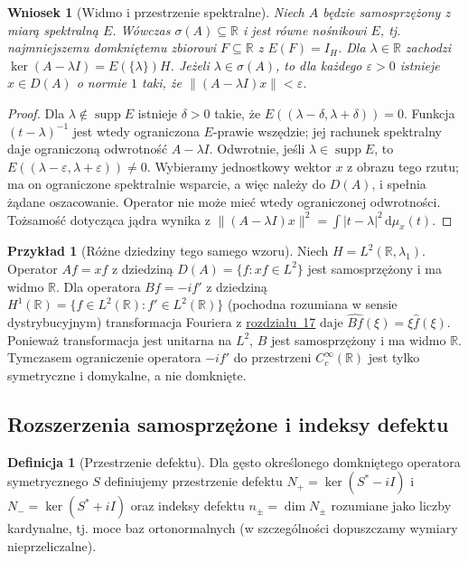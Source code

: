 \documentclass[11pt,a4paper]{article}
\numberwithin{equation}{section}
\theoremstyle{plain}
\newtheorem{wniosek}[twierdzenie]{Wniosek}
\theoremstyle{definition}
\newtheorem{definicja}[twierdzenie]{Definicja}
\newtheorem{przyklad}[twierdzenie]{Przykład}
\theoremstyle{remark}
\newcommand{\R}{\mathbb R}
\begin{document}
\begin{wniosek}[Widmo i przestrzenie spektralne]
\label{cor:unbounded-spectrum33}
Niech $A$ będzie samosprzężony z miarą spektralną $E$.
Wówczas $\sigma(A)\subseteq\R$ i jest równe nośnikowi $E$,
tj. najmniejszemu domkniętemu zbiorowi $F\subseteq\R$
z $E(F)=I_H$. Dla $\lambda\in\R$ zachodzi
$\ker(A-\lambda I)=E(\{\lambda\})H$.
Jeżeli $\lambda\in\sigma(A)$, to dla każdego $\varepsilon>0$
istnieje $x\in D(A)$ o normie $1$ taki, że
$\|(A-\lambda I)x\|<\varepsilon$.
\end{wniosek}
\begin{proof}
Dla $\lambda\notin\operatorname{supp}E$ istnieje $\delta>0$
takie, że $E((\lambda-\delta,\lambda+\delta))=0$.
Funkcja $(t-\lambda)^{-1}$ jest wtedy ograniczona
$E$-prawie wszędzie; jej rachunek spektralny daje ograniczoną
odwrotność $A-\lambda I$. Odwrotnie, jeśli
$\lambda\in\operatorname{supp}E$, to
$E((\lambda-\varepsilon,\lambda+\varepsilon))\ne0$.
Wybieramy jednostkowy wektor $x$ z obrazu tego rzutu;
ma on ograniczone spektralnie wsparcie, a więc należy do $D(A)$,
i spełnia żądane oszacowanie. Operator nie może mieć wtedy
ograniczonej odwrotności. Tożsamość dotycząca jądra wynika
z $\|(A-\lambda I)x\|^2=\int|t-\lambda|^2\,\mathrm d\mu_x(t)$.
\end{proof}

\begin{przyklad}[Różne dziedziny tego samego wzoru]
Niech $H=L^2(\R,\lambda_1)$.
Operator $Af=xf$ z dziedziną $D(A)=\{f:xf\in L^2\}$ jest
samosprzężony i ma widmo $\R$. Dla operatora
$Bf=-if'$ z dziedziną $H^1(\R)=\{f\in L^2(\R):f'\in L^2(\R)\}$
(pochodna rozumiana w sensie dystrybucyjnym) transformacja Fouriera
z \hyperref[sec:gladkie-schwartz17]{rozdziału~17} daje
$\widehat{Bf}(\xi)=\xi\widehat f(\xi)$.
Ponieważ transformacja jest unitarna na $L^2$, $B$ jest
samosprzężony i ma widmo $\R$. Tymczasem ograniczenie
operatora $-if'$ do przestrzeni $C_c^\infty(\R)$
jest tylko symetryczne i domykalne, a nie domknięte.
\end{przyklad}

\subsection{Rozszerzenia samosprzężone i indeksy defektu}

\begin{definicja}[Przestrzenie defektu]
\label{def:deficiency33}
Dla gęsto określonego domkniętego operatora symetrycznego
$S$ definiujemy przestrzenie defektu
$N_+=\ker(S^*-iI)$ i $N_-=\ker(S^*+iI)$
oraz indeksy defektu $n_\pm=\dim N_\pm$ rozumiane jako liczby
kardynalne, tj. moce baz ortonormalnych (w szczególności
dopuszczamy wymiary nieprzeliczalne).
\end{definicja}
\end{document}
